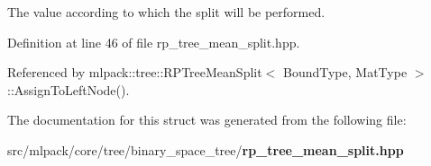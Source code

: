 The value according to which the split will be performed. 



Definition at line 46 of file rp\+\_\+tree\+\_\+mean\+\_\+split.\+hpp.



Referenced by mlpack\+::tree\+::\+R\+P\+Tree\+Mean\+Split$<$ Bound\+Type, Mat\+Type $>$\+::\+Assign\+To\+Left\+Node().



The documentation for this struct was generated from the following file\+:\begin{DoxyCompactItemize}
\item 
src/mlpack/core/tree/binary\+\_\+space\+\_\+tree/{\bf rp\+\_\+tree\+\_\+mean\+\_\+split.\+hpp}\end{DoxyCompactItemize}
